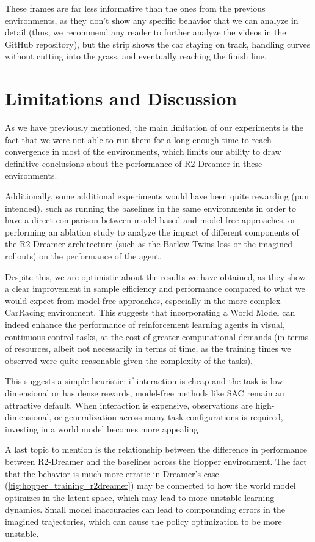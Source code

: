 \documentclass{article}
\begin{document}
These frames are far less informative than the ones from the previous environments, as they don't show any specific behavior that we can analyze in detail (thus, we recommend any reader to further analyze the videos in the GitHub repository), but the strip shows the car staying on track, handling curves without cutting into the grass, and eventually reaching the finish line.

\section{Limitations and Discussion}

As we have previously mentioned, the main limitation of our experiments is the fact that we were not able to run them for a long enough time to reach convergence in most of the environments, which limits our ability to draw definitive conclusions about the performance of R2-Dreamer in these environments.

Additionally, some additional experiments would have been quite rewarding (pun intended), such as running the baselines in the same environments in order to have a direct comparison between model-based and model-free approaches, or performing an ablation study to analyze the impact of different components of the R2-Dreamer architecture (such as the Barlow Twins loss or the imagined rollouts) on the performance of the agent.

Despite this, we are optimistic about the results we have obtained, as they show a clear improvement in sample efficiency and performance compared to what we would expect from model-free approaches, especially in the more complex CarRacing environment. This suggests that incorporating a World Model can indeed enhance the performance of reinforcement learning agents in visual, continuous control tasks, at the cost of greater computational demands (in terms of resources, albeit not necessarily in terms of time, as the training times we observed were quite reasonable given the complexity of the tasks).

This suggests a simple heuristic: if interaction is cheap and the task is low-dimensional or has dense rewards, model-free methods like SAC remain an attractive default. When interaction is expensive, observations are high-dimensional, or generalization across many task configurations is required, investing in a world model becomes more appealing

A last topic to mention is the relationship between the difference in performance between R2-Dreamer and the baselines across the Hopper environment. The fact that the behavior is much more erratic in Dreamer's case (\ref{fig:hopper_training_r2dreamer}) may be connected to how the world model optimizes in the latent space, which may lead to more unstable learning dynamics. Small model inaccuracies can lead to compounding errors in the imagined trajectories, which can cause the policy optimization to be more unstable.
\end{document}
